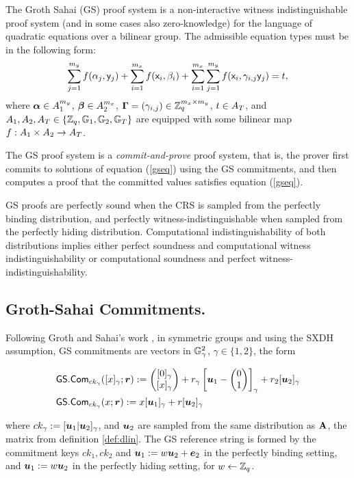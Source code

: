 
The Groth Sahai (GS) proof system is a non-interactive witness indistinguishable proof system (and in some cases also zero-knowledge) for the language of quadratic equations over a bilinear group. The admissible equation types must be in the following form:
\begin{equation}\label{gseq}
\sum_{j=1}^{m_y} f(\alpha_j, \mathsf{y}_j)+\sum_{i=1}^{m_x} f(\mathsf{x}_i, \beta_i)+\sum_{i=1}^{m_x} \sum_{j=1}^{m_y}  f(\mathsf{x}_i,\gamma_{i,j} \mathsf{y}_j)=t,
\end{equation}
 where $\boldsymbol \alpha  \in A_1^{m_y}$, $\boldsymbol \beta  \in A_2^{m_x}$, $\mathbf{{\Gamma}}=(\gamma_{i,j}) \in \mathbb{Z}_q^{m_x\times m_y}$, $t \in A_T$, and $A_1,A_2,A_T\in\{\mathbb{Z}_q,\mathbb{G}_1,\mathbb{G}_2, \mathbb{G}_T\}$ 
are equipped with some bilinear map $f:A_1\times A_2 \rightarrow A_T$.

The GS proof system is a \emph{commit-and-prove} proof system, that is, the prover first commits to solutions
of equation (\ref{gseq}) using the GS commitments, and then computes a proof that the committed values satisfies equation (\ref{gseq}).

GS proofs are perfectly sound when the CRS is sampled from the perfectly binding distribution, and perfectly witness-indistinguishable when sampled from the perfectly hiding distribution. Computational indistinguishability of  both distributions implies either perfect soundness and computational witness indistinguishability or computational soundness and perfect witness-indistinguishability.

\subsection{Groth-Sahai Commitments.}
Following Groth and Sahai's work \cite{EC:GroSah08}, in symmetric groups and using the SXDH assumption, GS commitments are vectors in $\mathbb{G}^2_\gamma$, $\gamma\in\{1,2\}$, the form
\begin{small}\begin{align*}
&{\mathsf{GS}}.\mathsf{Com}_{ck_\gamma}([x]_\gamma;{\boldsymbol{r}}):=\left(\begin{matrix}{[0]_\gamma}\\{[x]_\gamma}\end{matrix}\right)+r_\gamma\left[{\boldsymbol{u}}_1-\left(\begin{matrix}0\\1\end{matrix}\right)\right]_\gamma+{r}_2[{\boldsymbol{u}}_2]_\gamma\\
&{\mathsf{GS}}.\mathsf{Com}_{ck_\gamma}(x;{\boldsymbol{r}}):=x[{\boldsymbol{u}}_1]_\gamma+{r}[{\boldsymbol{u}}_2]_\gamma
\end{align*}\end{small}
where $ck_\gamma:=[{\boldsymbol{u}}_1|{\boldsymbol{u}}_2]_\gamma$, and ${\boldsymbol{u}}_2$ are sampled from the same distribution as $\mathbf{{A}}$, the matrix from definition \ref{def:dlin}. The GS reference string is formed by the commitment keys $ck_1,ck_2$  and ${\boldsymbol{u}}_1:=w{\boldsymbol{u}}_2+{\boldsymbol{e}}_2$ in the perfectly binding setting, and ${\boldsymbol{u}}_1:=w{\boldsymbol{u}}_2$ in the perfectly hiding setting, for $w\gets\mathbb{Z}_q$.

